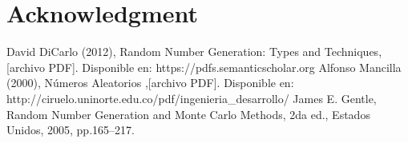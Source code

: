 \documentclass[conference,a4paper]{IEEEtran}
\begin{document}
\section*{Acknowledgment}



\begin{thebibliography}{0}
 David DiCarlo (2012), Random Number Generation: Types and Techniques, [archivo PDF]. Disponible en: https://pdfs.semanticscholar.org
 Alfonso Mancilla (2000), N\'umeros Aleatorios ,[archivo PDF]. Disponible en: http://ciruelo.uninorte.edu.co/pdf/ingenieria\_desarrollo/
 James E. Gentle, Random Number Generation and Monte Carlo Methods, 2da ed., Estados Unidos, 2005, pp.165--217.

\end{thebibliography}
\vspace{12pt}
\end{document}
